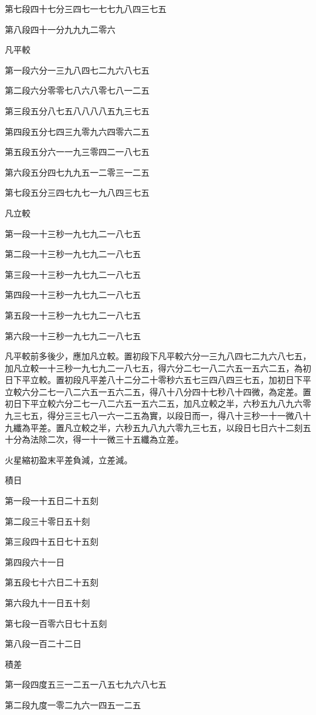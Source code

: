 第七段四十七分三四七一七七九八四三七五

第八段四十一分九九九二零六

凡平較

第一段六分一三九八四七二九六八七五

第二段六分零零七八六八零七八一二五

第三段五分八七五八八八八五九三七五

第四段五分七四三九零九六四零六二五

第五段五分六一一九三零四二一八七五

第六段五分四七九九五一二零三一二五

第七段五分三四七九七一九八四三七五

凡立較

第一段一十三秒一九七九二一八七五

第二段一十三秒一九七九二一八七五

第三段一十三秒一九七九二一八七五

第四段一十三秒一九七九二一八七五

第五段一十三秒一九七九二一八七五

第六段一十三秒一九七九二一八七五

凡平較前多後少，應加凡立較。置初段下凡平較六分一三九八四七二九六八七五，加凡立較一十三秒一九七九二一八七五，得六分二七一八二六五一五六二五，為初日下平立較。置初段凡平差八十二分二十零秒六五七三四八四三七五，加初日下平立較六分二七一八二六五一五六二五，得八十八分四十七秒八十四微，為定差。置初日下平立較六分二七一八二六五一五六二五，加凡立較之半，六秒五九八九六零九三七五，得分三三七八一六一二五為實，以段日而一，得八十三秒一十一微八十九纖為平差。置凡立較之半，六秒五九八九六零九三七五，以段日七日六十二刻五十分為法除二次，得一十一微三十五纖為立差。

火星縮初盈末平差負減，立差減。

積日

第一段一十五日二十五刻

第二段三十零日五十刻

第三段四十五日七十五刻

第四段六十一日

第五段七十六日二十五刻

第六段九十一日五十刻

第七段一百零六日七十五刻

第八段一百二十二日

積差

第一段四度五三一二五一八五七九六八七五

第二段九度一零二九六一四五一二五


